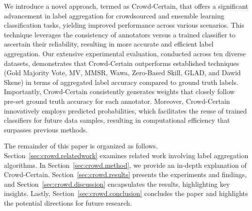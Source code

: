 We introduce a novel approach, termed as Crowd-Certain, that offers a significant advancement in label aggregation for crowdsourced and ensemble learning classification tasks, yielding improved performance across various scenarios. This technique leverages the consistency of annotators versus a trained classifier to ascertain their reliability, resulting in more accurate and efficient label aggregation.
Our extensive experimental evaluation, conducted across ten diverse datasets, demonstrates that Crowd-Certain outperforms established techniques (Gold Majority Vote, MV, MMSR, Wawa, Zero-Based Skill, GLAD, and Dawid Skene) in terms of aggregated label accuracy compared to ground truth labels. Importantly, Crowd-Certain consistently generates weights that closely follow pre-set ground truth accuracy for each annotator. Moreover, Crowd-Certain innovatively employs predicted probabilities, which facilitates the reuse of trained classifiers for future data samples, resulting in computational efficiency that surpasses previous methods.

The remainder of this paper is organized as follows. Section~\ref{sec:crowd.relatedwork} examines related work involving label aggregation algorithms. In Section~\ref{sec:crowd.method}, we provide an in-depth explanation of Crowd-Certain. Section~\ref{sec:crowd.results} presents the experiments and findings, and Section~\ref{sec:crowd.discussion} encapsulates the results, highlighting key insights. Lastly, Section~\ref{sec:crowd.conclusion} concludes the paper and highlights the potential directions for future research.


